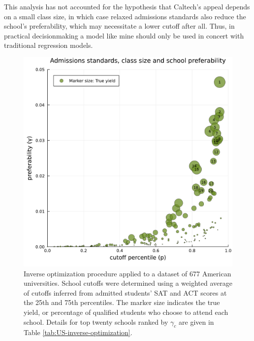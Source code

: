 \documentclass[12pt]{article}
\theoremstyle{definition}
\begin{document}
This analysis has not accounted for the hypothesis that Caltech's appeal depends on a small class size, in which case relaxed admissions standards also reduce the school's preferability, which may necessitate a lower cutoff after all. Thus, in practical decisionmaking a model like mine should only be used in concert with traditional regression models. 

\begin{figure}
\begin{center}\includegraphics[width=\linewidth, ]{plots/US-cutoff-gamma.pdf}\end{center}
\captionsetup{singlelinecheck=off}
    \caption[.]{Inverse optimization procedure applied to a dataset of 677 American universities. School cutoffs were determined using a weighted average of cutoffs inferred from admitted students' SAT and ACT scores at the 25th and 75th percentiles. The marker size indicates the true yield, or percentage of qualified students who choose to attend each school. Details for top twenty schools ranked by $\gamma_c$ are given in Table \ref{tab:US-inverse-optimization}.}
\label{US-cutoff-gamma}
\end{figure}
\end{document}
